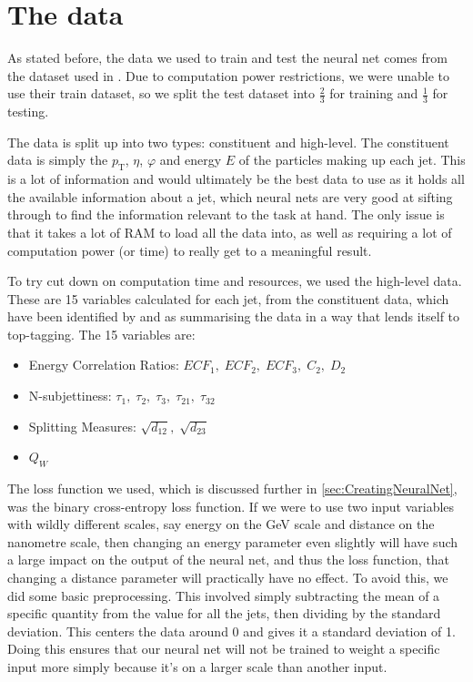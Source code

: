 \documentclass[11pt]{article}
\numberwithin{equation}{section}
\numberwithin{figure}{section}
\numberwithin{table}{section}
\begin{document}
\section{The data}\label{sec:Data}
As stated before, the data we used to train and test the neural net comes from the dataset used in \cite{top-tagging-data}. Due to computation power restrictions, we were unable to use their train dataset, so we split the test dataset into $\frac 23$ for training and $\frac 13$ for testing.

The data is split up into two types: constituent and high-level. The constituent data is simply the $p_\mathrm{T}$, $\eta$, $\varphi$ and energy $E$ of the particles making up each jet. This is a lot of information and would ultimately be the best data to use as it holds all the available information about a jet, which neural nets are very good at sifting through to find the information relevant to the task at hand. The only issue is that it takes a lot of RAM to load all the data into, as well as requiring a lot of computation power (or time) to really get to a meaningful result. 

To try cut down on computation time and resources, we used the high-level data. These are 15 variables calculated for each jet, from the constituent data, which have been identified by \cite{ATL-PHYS-PUB-2021-028} and \cite{ATL-PHYS-PUB-2017-004} as summarising the data in a way that lends itself to top-tagging. The 15 variables are:

\begin{itemize}
    \item Energy Correlation Ratios: $ECF_1,\; ECF_2,\; ECF_3,\; C_2,\; D_2$
    \item N-subjettiness: $\tau_1,\; \tau_2,\; \tau_3,\; \tau_{21},\; \tau_{32}$
    \item Splitting Measures: $\sqrt{d_{12}},\; \sqrt{d_{23}}$
    \item $Q_W$
\end{itemize}

The loss function we used, which is discussed further in \cref{sec:CreatingNeuralNet}, was the binary cross-entropy loss function. If we were to use two input variables with wildly different scales, say energy on the \si[]{\giga\electronvolt} scale and distance on the nanometre scale, then changing an energy parameter even slightly will have such a large impact on the output of the neural net, and thus the loss function, that changing a distance parameter will practically have no effect. To avoid this, we did some basic preprocessing. This involved simply subtracting the mean of a specific quantity from the value for all the jets, then dividing by the standard deviation. This centers the data around 0 and gives it a standard deviation of 1. Doing this ensures that our neural net will not be trained to weight a specific input more simply because it's on a larger scale than another input.
\end{document}
